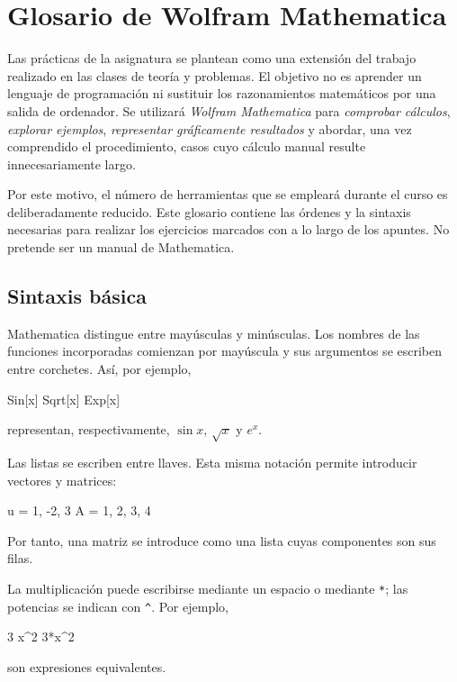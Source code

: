 \chapter*{Glosario de Wolfram Mathematica}


\DeclareRobustCommand{\MatCmd}[1]{\texttt{#1}}
\AddToNoCaseChangeList{\MatCmd}

Las prácticas de la asignatura se plantean como una extensión del trabajo realizado en las clases de teoría y problemas. El objetivo no es aprender un lenguaje de programación ni sustituir los razonamientos matemáticos por una salida de ordenador. Se utilizará \textit{Wolfram Mathematica} para \emph{comprobar cálculos}, \emph{explorar ejemplos}, \emph{representar gráficamente resultados} y abordar, una vez comprendido el procedimiento, casos cuyo cálculo manual resulte innecesariamente largo.

Por este motivo, el número de herramientas que se empleará durante el curso es deliberadamente reducido. Este glosario contiene las órdenes y la sintaxis necesarias para realizar los ejercicios marcados con \M a lo largo de los apuntes. No pretende ser un manual de Mathematica.

\section*{Sintaxis básica}

Mathematica distingue entre mayúsculas y minúsculas. Los nombres de las funciones incorporadas comienzan por mayúscula y sus argumentos se escriben entre corchetes. Así, por ejemplo,
\begin{mathematicacode}
Sin[x]
Sqrt[x]
Exp[x]
\end{mathematicacode}
representan, respectivamente, $\sin x$, $\sqrt{x}$ y $e^x$.

Las listas se escriben entre llaves. Esta misma notación permite introducir vectores y matrices:
\begin{mathematicacode}
u = {1, -2, 3}
A = {{1, 2}, {3, 4}}
\end{mathematicacode}
Por tanto, una matriz se introduce como una lista cuyas componentes son sus filas.

La multiplicación puede escribirse mediante un espacio o mediante \MatCmd{*}; las potencias se indican con \MatCmd{\string^}. Por ejemplo,
\begin{mathematicacode}
3 x^2
3*x^2
\end{mathematicacode}
son expresiones equivalentes.

